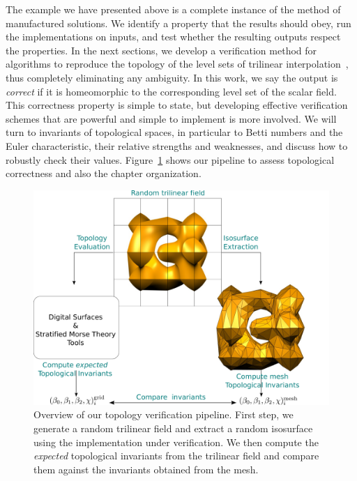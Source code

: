 The example we have presented above is a complete instance of the
method of manufactured solutions. We identify a property that the
results should obey, run the implementations on inputs, and test
whether the resulting outputs respect the properties.
%
In the next sections, we develop a verification method for algorithms
to reproduce the topology of the level sets of trilinear
interpolation~\cite{Chernyaev95marchingcubes,lopes:tvcg:2003,Nielson03onmarching},
thus completely eliminating any ambiguity. In this work, we say the
output is \emph{correct} if it is homeomorphic to the corresponding
level set of the scalar field.
%
This correctness property is simple to state, but developing effective
verification schemes that are powerful and simple to implement is more
involved. We will turn to invariants of topological spaces, in
particular to Betti numbers and the Euler characteristic, 
their relative strengths and weaknesses, and discuss how to robustly check
their values.  Figure~\ref{fig:pipeline} shows our pipeline to assess
topological correctness and also the chapter organization.

\begin{figure}[t]
\begin{center}
\includegraphics[width=1.0\linewidth,keepaspectratio=true]{chapter3/figures/pipeline.pdf}
\caption{Overview of our topology verification pipeline. First step,
  we generate a random trilinear field and extract a random isosurface
  using the implementation under verification. We then compute the
  \emph{expected} topological invariants from the trilinear field and
  compare them against the invariants obtained from the mesh. }
\label{fig:pipeline}
\end{center}
\end{figure}

